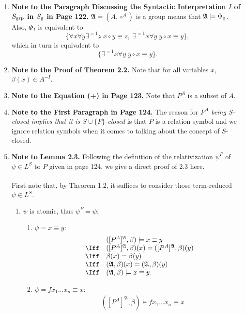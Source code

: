 \begin{enumerate}[1.]
%
\item \textbf{Note to the Paragraph Discussing the Syntactic Interpretation $I$ of $S_{\mbox{\scriptsize grp}}$ in $S_{\mbox{\scriptsize g}}$ in Page 122.} $\mathfrak{A} = (A, \circ^A)$ is a group means that $\mathfrak{A} \models \Phi_{\mbox{\scriptsize g}}$. Also, $\Phi_I$ is equivalent to
\[
\{ \forall x \forall y \exists^{=1}z \; x \circ y \equiv z, \; \exists^{=1}x \forall y \; y \circ x \equiv y \},
\]
which in turn is equivalent to
\[
\{ \exists^{=1} x \forall y \; y \circ x \equiv y \}.
\]
%
\item \textbf{Note to the Proof of Theorem 2.2.} Note that for all variables $x$, $\beta (x) \in A^{-I}$.
%
\item \textbf{Note to the Equation (+) in Page 123.} Note that $P^A$ is a subset of $A$.
%
\item \textbf{Note to the First Paragraph in Page 124.} The reason for \textit{$P^A$ being $S$-closed implies that it is $S \cup \{ P \}$-closed} is that $P$ is a relation symbol and we ignore relation symbols when it comes to talking about the concept of $S$-closed.
%
\item \textbf{Note to Lemma 2.3.} Following the definition of the relativization $\psi^P$ of $\psi \in L^S$ to $P$ given in page 124, we give a direct proof of 2.3 here.\\
\\
First note that, by Theorem 1.2, it suffices to consider those term-reduced $\psi \in L^S$.
\begin{enumerate}[1.]
\item $\psi$ is atomic, thus $\psi^P = \psi$:
\begin{enumerate}[(1)]
\item $\psi = x \equiv y$:
\[
\begin{array}{ll}
\    & ([P^A]^{\mathfrak{A}}, \beta) \models x \equiv y \\
\Iff & ([P^A]^{\mathfrak{A}}, \beta)(x) = ([P^A]^{\mathfrak{A}}, \beta)(y) \\
\Iff & \beta(x) = \beta(y) \\
\Iff & (\mathfrak{A}, \beta)(x) = (\mathfrak{A}, \beta)(y) \\
\Iff & (\mathfrak{A}, \beta) \models x \equiv y.
\end{array}
\]
\item $\psi = fx_1 \ldots x_n \equiv x$:
\[
\begin{array}{ll}
\    & ([P^A]^{\mathfrak{A}}, \beta) \models fx_1 \ldots x_n \equiv x \\

\end{array}\]
\end{enumerate}
\end{enumerate}
\end{enumerate}
